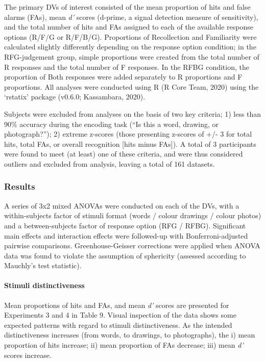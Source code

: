 \documentclass[
  11pt,
]{article}
\begin{document}
\hfill\break The primary DVs of interest consisted of the mean
proportion of hits and false alarms (FAs), mean \emph{d'} scores
(d-prime, a signal detection measure of sensitivity), and the total
number of hits and FAs assigned to each of the available response
options (R/F/G or R/F/B/G). Proportions of Recollection and Familiarity
were calculated slightly differently depending on the response option
condition; in the RFG-judgement group, simple proportions were created
from the total number of R responses and the total number of F
responses. In the RFBG condition, the proportion of Both responses were
added separately to R proportions and F proportions. All analyses were
conducted using R (R Core Team, 2020) using the `rstatix' package
(v0.6.0; Kassambara, 2020).

Subjects were excluded from analyses on the basis of two key criteria;
1) less than 90\% accuracy during the encoding task (``Is this a word,
drawing, or photograph?''); 2) extreme z-scores (those presenting
z-scores of +/- 3 for total hits, total FAs, or overall recognition
{[}hits minus FAs{]}). A total of 3 participants were found to meet (at
least) one of these criteria, and were thus considered outliers and
excluded from analysis, leaving a total of 161 datasets.

\hypertarget{results-3}{%
\subsubsection{Results}\label{results-3}}

A series of 3x2 mixed ANOVAs were conducted on each of the DVs, with a
within-subjects factor of stimuli format (words / colour drawings /
colour photos) and a between-subjects factor of response option (RFG /
RFBG). Significant main effects and interaction effects were followed-up
with Bonferroni-adjusted pairwise comparisons. Greenhouse-Geisser
corrections were applied when ANOVA data was found to violate the
assumption of sphericity (assessed according to Mauchly's test
statistic).

\hypertarget{stimuli-distinctiveness-1}{%
\paragraph{Stimuli distinctiveness}\label{stimuli-distinctiveness-1}}

\hfill\break Mean proportions of hits and FAs, and mean \emph{d'} scores
are presented for Experiments 3 and 4 in Table 9. Visual inspection of
the data shows some expected patterns with regard to stimuli
distinctiveness. As the intended distinctiveness increases (from words,
to drawings, to photographs), the i) mean proportion of hits increase;
ii) mean proportion of FAs decrease; iii) mean \emph{d'} scores
increase.
\end{document}
